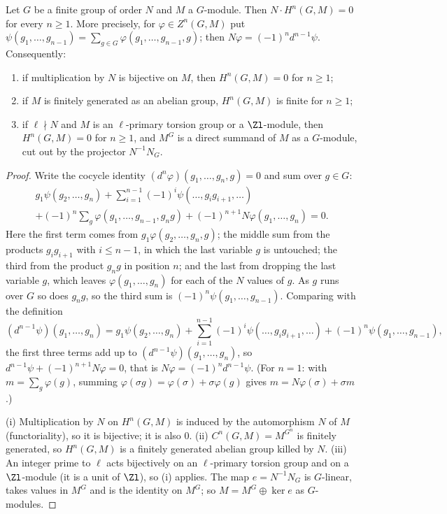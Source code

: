 \begin{theorem}\label{thm:cohomology:order-kills}
Let $G$ be a finite group of order $N$ and $M$ a $G$-module. Then $N\cdot H^n(G,M)=0$ for every $n\ge1$. More precisely, for $\varphi\in Z^n(G,M)$ put
$\psi(g_1,\dots,g_{n-1})=\sum_{g\in G}\varphi(g_1,\dots,g_{n-1},g)$; then $N\varphi=(-1)^nd^{n-1}\psi$. Consequently:
\begin{enumerate}[label=(\roman*)]
\item if multiplication by $N$ is bijective on $M$, then $H^n(G,M)=0$ for $n\ge1$;
\item if $M$ is finitely generated as an abelian group, $H^n(G,M)$ is finite for $n\ge1$;
\item if $\ell\nmid N$ and $M$ is an $\ell$-primary torsion group or a $\Zl$-module, then $H^n(G,M)=0$ for $n\ge1$, and $M^G$ is a direct summand of $M$ as a
$G$-module, cut out by the projector $N^{-1}N_G$.
\end{enumerate}
\end{theorem}

\begin{proof}
Write the cocycle identity $(d^n\varphi)(g_1,\dots,g_n,g)=0$ and sum over $g\in G$:
\begin{multline*}
g_1\psi(g_2,\dots,g_n)+\sum_{i=1}^{n-1}(-1)^i\psi(\dots,g_ig_{i+1},\dots)\\
+(-1)^n\sum_{g}\varphi(g_1,\dots,g_{n-1},g_ng)+(-1)^{n+1}N\varphi(g_1,\dots,g_n)=0.
\end{multline*}
Here the first term comes from $g_1\varphi(g_2,\dots,g_n,g)$; the middle sum from the products $g_ig_{i+1}$ with $i\le n-1$, in which the last variable $g$ is
untouched; the third from the product $g_ng$ in position $n$; and the last from dropping the last variable $g$, which leaves $\varphi(g_1,\dots,g_n)$ for each of the
$N$ values of $g$. As $g$ runs over $G$ so does $g_ng$, so the third sum is $(-1)^n\psi(g_1,\dots,g_{n-1})$. Comparing with the definition
\[
(d^{n-1}\psi)(g_1,\dots,g_n)=g_1\psi(g_2,\dots,g_n)+\sum_{i=1}^{n-1}(-1)^i\psi(\dots,g_ig_{i+1},\dots)+(-1)^n\psi(g_1,\dots,g_{n-1}),
\]
the first three terms add up to $(d^{n-1}\psi)(g_1,\dots,g_n)$, so $d^{n-1}\psi+(-1)^{n+1}N\varphi=0$, that is
$N\varphi=(-1)^nd^{n-1}\psi$. (For $n=1$: with $m=\sum_g\varphi(g)$, summing $\varphi(\sigma g)=\varphi(\sigma)+\sigma\varphi(g)$ gives $m=N\varphi(\sigma)+\sigma m$.)

(i) Multiplication by $N$ on $H^n(G,M)$ is induced by the automorphism $N$ of $M$ (functoriality), so it is bijective; it is also $0$. (ii) $C^n(G,M)=M^{G^n}$ is
finitely generated, so $H^n(G,M)$ is a finitely generated abelian group killed by $N$. (iii) An integer prime to $\ell$ acts bijectively on an $\ell$-primary
torsion group and on a $\Zl$-module (it is a unit of $\Zl$), so (i) applies. The map $e=N^{-1}N_G$ is $G$-linear, takes values in $M^G$ and is the identity
on $M^G$; so $M=M^G\oplus\ker e$ as $G$-modules.
\end{proof}

